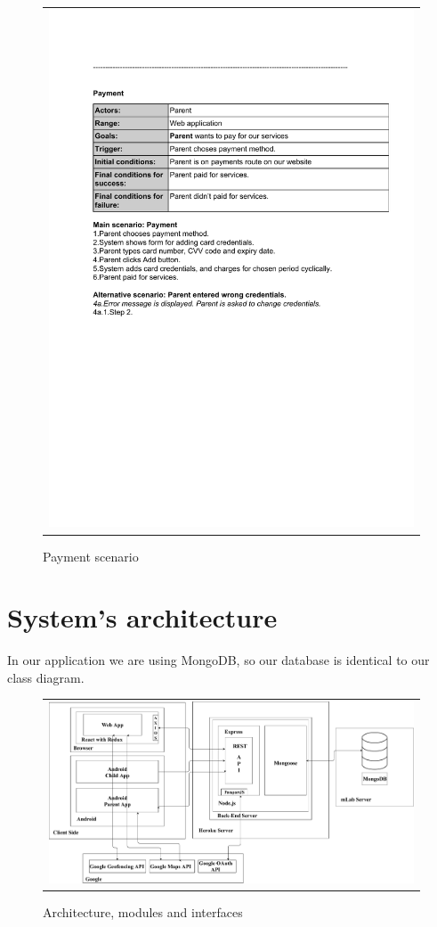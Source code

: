 \documentclass{sprawozdanie-agh}
\begin{document}
		\begin{figure}[H] 
			\centering
			\begin{tabular}{c}
				\includegraphics[width=.80\textwidth]{pay_cropped} 
			\end{tabular}  
		\caption{Payment scenario}
		\end{figure}

	\section{System's architecture}
		In our application we are using MongoDB, so our database is identical to our class diagram.
		
		\begin{figure}[H] 
			\centering
			\begin{tabular}{c}
				\includegraphics[width=.95\textwidth]{moduly_interfejsy_komunikacyjne}
			\end{tabular} 
			\caption{Architecture, modules and interfaces}
		\end{figure}
\end{document}
